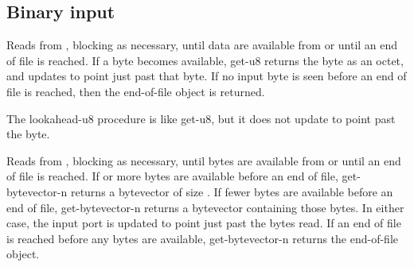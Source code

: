 \subsection{Binary input}

\begin{entry}{%
}
   
Reads from , blocking as necessary, until data are
available from  or until an end of file is reached.
If a byte becomes available, {\cf get-u8} returns the byte as an octet, and
updates  to point just past that byte. If no input
byte is seen before an end of file is reached, then the end-of-file
object is returned.
\end{entry}

\begin{entry}{%
}
   
The {\cf lookahead-u8} procedure is like {\cf get-u8}, but it does not 
update  to point past the byte.
\end{entry}

\begin{entry}{%
}
   
Reads from , blocking as necessary, until 
bytes are available from  or until an end of file is
reached. If  or more bytes are available before an end
of file, {\cf get-bytevector-n} returns a bytevector of size .
If fewer bytes are available before an end of file, {\cf get-bytevector-n}
returns a bytevector
containing those bytes. In either case, the input port is updated to
point just past the bytes read.  If an end of file is reached before
any bytes are available, {\cf get-bytevector-n} returns the end-of-file object.
\end{entry}

